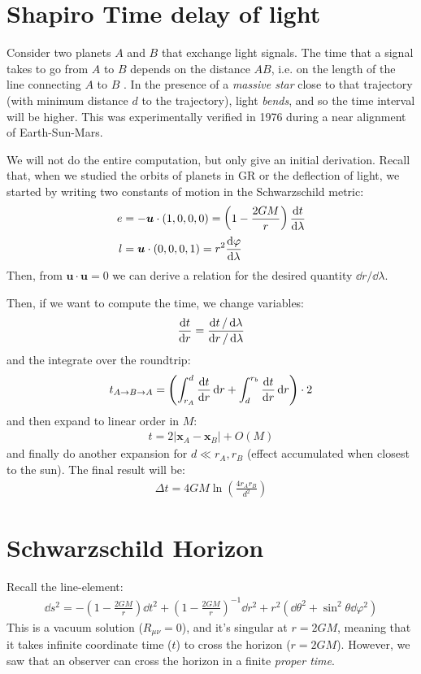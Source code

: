 \documentclass[../template.tex]{subfiles}
\begin{document}
\section{Shapiro Time delay of light}

Consider two planets $A$ and $B$ that exchange light signals. The time that a signal takes to go from $A$ to $B$ depends on the distance $AB$, i.e. on the length of the line connecting $A$ to $B$  . In the presence of a \textit{massive star} close to that trajectory (with minimum distance $d$ to the trajectory), light \textit{bends}, and so the time interval will be higher. This was experimentally verified in 1976 during a near alignment of Earth-Sun-Mars. 

We will not do the entire computation, but only give an initial derivation. Recall that, when we studied the orbits of planets in GR or the deflection of light, we started by writing two constants of motion in the Schwarzschild metric:
\begin{align*}
    e &= -\bm{u} \cdot (1,0,0,0) = \left(1-\frac{2GM}{r}\right)\dv{t}{\lambda}\\
    l &= \bm{u} \cdot (0,0,0,1) = r^2 \dv{\varphi}{\lambda}
\end{align*}
Then, from $\bm{u}\cdot \bm{u} = 0$ we can derive a relation for the desired quantity $\dd{r}/\dd{\lambda}$.

Then, if we want to compute the time, we change variables:
\begin{align*}
    \dv{t}{r} = \frac{\dd{t}/\dd{\lambda}}{\dd{r}/\dd{\lambda}} 
\end{align*}
and the integrate over the roundtrip:
\begin{align*}
    t_{A \to B \to  A} = \left(\int_{r_A}^d \dv{t}{r} \dd{r} + \int_d^{r_b} \dv{t}{r} \dd{r}\right) \cdot 2
\end{align*}
and then expand to linear order in $M$:
\begin{align*}
    t = 2 |\bm{x}_A - \bm{x}_B| + O(M)
\end{align*} 
and finally do another expansion for $d \ll r_A, r_B$ (effect accumulated when closest to the sun). The final result will be:
\begin{align*}
    \Delta t= 4 GM \ln \left(\frac{4 r_A r_B}{d^2} \right)
\end{align*}

\section{Schwarzschild Horizon}
Recall the line-element:
\begin{align*}
    \dd{s}^2 = -\left(1-\frac{2GM}{r} \right)\dd{t}^2 + \left(1-\frac{2GM}{r} \right)^{-1} \dd{r}^2 + r^2 (\dd{\theta}^2 + \sin^2\theta \dd{\varphi}^2 )
\end{align*}
This is a vacuum solution ($R_{\mu \nu} = 0$), and it's singular at $r=2GM$, meaning that it takes infinite coordinate time ($t$) to cross the horizon ($r = 2GM$). However, we saw that an observer can cross the horizon in a finite \textit{proper time}. 
\end{document}
